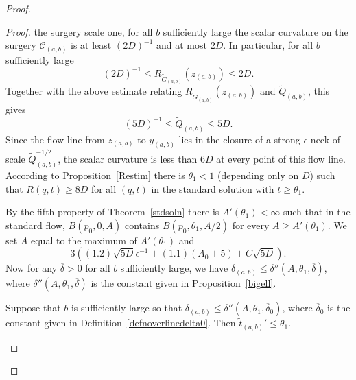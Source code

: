 \begin{proof}
\begin{proof}
the surgery scale one, for all $b$ sufficiently large the scalar
curvature on the surgery ${\mathcal C}_{(a,b)}$ is at least
$(2D)^{-1}$ and at most $2D$. In particular, for all $b$
sufficiently large
$$(2D)^{-1}\le R_{\widetilde G_{(a,b)}}(z_{(a,b)})\le 2D.$$
Together with the above estimate relating $R_{\widetilde G_{(a,b)}}(z_{(a,b)})$ and
$\tilde Q_{(a,b)}$, this gives
\begin{equation}\label{DQ}
(5D)^{-1}\le
\tilde Q_{(a,b)}\le 5D.
\end{equation} Since the flow line from
$z_{(a,b)}$ to $y_{(a,b)}$ lies in the closure of a strong
$\epsilon$-neck of scale $\tilde Q_{(a,b)}^{-1/2}$, the scalar curvature is
less than
 $6D$ at every point of this flow line.
 According to Proposition~\ref{Restim} there is $\theta_1<1$
(depending only on $D$) such that $R(q,t)\ge 8D$ for all $(q,t)$
in the standard solution with $t\ge \theta_1$.






By the fifth property of Theorem~\ref{stdsoln} there is
$A'(\theta_1)<\infty$ such that in the
 standard flow, $B(p_0,0,A)$ contains $B(p_0,\theta_1,A/2)$ for every $A\ge A'(\theta_1)$.
 We set $A$ equal to the maximum of $A'(\theta_1)$ and
 $$3\left((1.2)\sqrt{5D}\epsilon^{-1}+(1.1)(A_0+5)+C\sqrt{5D}\right).$$
Now for any $\overline\delta>0$ for all  $b$ sufficiently large, we
have $\delta_{(a,b)}\le \delta''(A,\theta_1,\overline\delta)$, where
$\delta''(A,\theta_1,\overline\delta)$
is the constant given in Proposition~\ref{bigell}.



\begin{claim}
\label{claim:tilde-t-prime-bounded-by-theta1}
 Suppose that $b$ is sufficiently large so that
$\delta_{(a,b)}\le \delta''(A,\theta_1,\overline\delta_0)$, where $\overline\delta_0$ is the constant
given in Definition~\ref{defnoverlinedelta0}. Then
$\tilde t_{(a,b)}'\le \theta_1$.
\end{claim}



\end{proof}
\end{proof}
